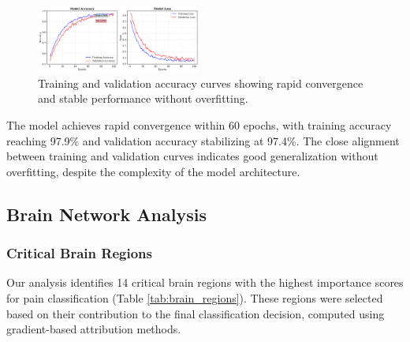 \documentclass[10pt,journal,compsoc]{IEEEtran}
\begin{document}
\begin{figure}[htbp]
\centering
\includegraphics[width=0.48\textwidth]{figures/training_curves.png}
\caption{Training and validation accuracy curves showing rapid convergence and stable performance without overfitting.}
\label{fig:training_curves}
\end{figure}

The model achieves rapid convergence within 60 epochs, with training accuracy reaching 97.9\% and validation accuracy stabilizing at 97.4\%. The close alignment between training and validation curves indicates good generalization without overfitting, despite the complexity of the model architecture.

\subsection{Brain Network Analysis}

\subsubsection{Critical Brain Regions}

Our analysis identifies 14 critical brain regions with the highest importance scores for pain classification (Table \ref{tab:brain_regions}). These regions were selected based on their contribution to the final classification decision, computed using gradient-based attribution methods.
\end{document}

